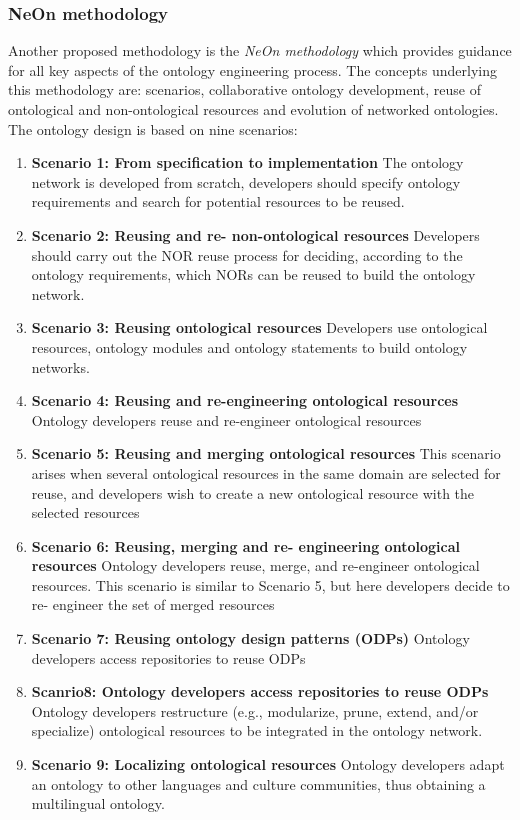 \subsubsection{NeOn methodology}
Another proposed methodology is the \textit{NeOn methodology}\cite{neon1}\cite{neon2} which provides guidance for all key aspects of the ontology engineering process. The concepts underlying this methodology are: scenarios, collaborative ontology development, reuse of ontological and non-ontological resources and evolution of networked ontologies. The ontology design is based on nine scenarios:
\begin{enumerate}
    \item \textbf{Scenario 1: From specification to implementation} The ontology network is developed from scratch, developers should specify ontology requirements and search for potential resources to be reused. 

    \item \textbf{Scenario 2: Reusing and re- non-ontological resources}  Developers should carry out the NOR reuse process for deciding, according to the ontology requirements, which NORs can be  reused to build the ontology network. 

    \item \textbf{Scenario 3: Reusing ontological resources} Developers use ontological resources, ontology modules and ontology statements to build ontology networks. 

    \item \textbf{Scenario 4: Reusing and re-engineering ontological resources} Ontology developers reuse and re-engineer ontological resources

    \item \textbf{Scenario 5: Reusing and merging ontological resources} This scenario arises when several ontological resources in the same domain are selected for reuse, and developers wish to create a new ontological resource with the selected resources

    \item \textbf{Scenario 6: Reusing, merging and re- engineering ontological resources} Ontology developers reuse, merge, and re-engineer ontological resources. This scenario is similar to Scenario 5, but here developers decide to re- engineer the set of merged resources

    \item  \textbf{Scenario 7: Reusing ontology design patterns (ODPs)} Ontology developers access repositories to reuse ODPs

    \item \textbf{Scanrio8: Ontology developers access repositories to reuse ODPs} Ontology developers restructure (e.g., modularize, prune, extend, and/or specialize) ontological resources to be  integrated in the ontology network. 

    \item \textbf{Scenario 9: Localizing ontological resources} Ontology developers adapt an ontology to other languages and culture communities, thus obtaining a multilingual ontology.

\end{enumerate}
